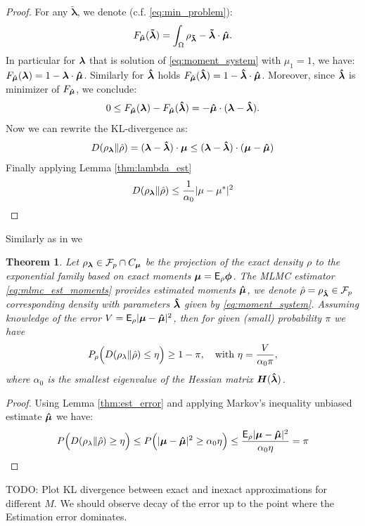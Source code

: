 \documentclass{article}
\newtheorem{theorem}{Theorem}[section]
\def\vc#1{\mathbf{\boldsymbol{#1}}}     %
\def\tn#1{\boldsymbol{#1}}
\def \E{{\mathsf E}}
\def\todo#1{{\color{red}TODO: #1}}
\def\abs#1{|#1|}
\begin{document}
\begin{proof}
\def\tvl{\vc{\tilde\lambda}}
For any $\tvl$, we denote (c.f. \eqref{eq:min_problem}):
\[
F_{\estvmu}(\tvl) = \int_{\Omega} \rho_{\tvl} - \tvl\cdot\estvmu.
\]
In particular for $\vl$ that is solution of \eqref{eq:moment_system} with $\mu_1 = 1$, we have:
$F_{\estvmu}(\vl) = 1 - \vl\cdot\estvmu$. Similarly for $\estvl$ holds
$F_{\estvmu}(\estvl) = 1 - \estvl\cdot\estvmu$. Moreover, since $\estvl$ is minimizer 
of $F_{\estvmu}$, we conclude:
\[
 0\le F_{\estvmu}(\vl) - F_{\estvmu}(\estvl) = - \estvmu\cdot(\vl - \estvl).
\]
Now we can rewrite the KL-divergence as:
\[
  D(\rho_{\vl}\Vert \estrho) = (\vl - \estvl)\cdot \vmu \le
  (\vl - \estvl)\cdot (\vmu - \estvmu)
\]
Finally applying Lemma \ref{thm:lambda_est}
\[
D(\rho_{\vl}\Vert \estrho) \le \frac{1}{\alpha_0} \abs{\mu - \mu^*}^2
\]
 
\end{proof}
Similarly as in \cite[Theorem 3]{Barron1991} we  
\begin{theorem}
  \label{eq:estimate_err_var}
  Let $\rho_{\vl} \in \mathcal F_p \cap C_{\vmu}$ be the projection of the exact density $\rho$ to the exponential family based on exact moments  $\vmu = \E_\rho \vphi$. The MLMC estimator \eqref{eq:mlmc_est_moments} provides estimated moments $\estvmu$, we denote $\estrho = \rho_{\estvl}\in \mathcal F_p$ corresponding density with parameters $\estvl$ given by \eqref{eq:moment_system}.
  Assuming knowledge of the error $V = \E_{\rho} |\vmu - \estvmu|^2$, then for given (small) probability $\pi$
  we have
  \[
      P_{\rho}\Big( D(\rho_{\lambda}\Vert \hat\rho) \le \eta\Big) \ge 1 - \pi,\quad 
      \text{with } \eta = \frac{V}{\alpha_0 \pi},
  \]
  where $\alpha_0$ is the smallest eigenvalue of the Hessian matrix $\tn H(\estvl)$.
  
\end{theorem}
\begin{proof}
  Using Lemma \ref{thm:est_error} and applying Markov's inequality unbiased estimate $\estvmu$ we have:
  \[
   P\Big( D(\rho_{\lambda}\Vert \estrho) \ge \eta\Big) 
   \le P\Big( \abs{\vmu - \estvmu}^2 \ge \alpha_0  \eta\Big)
   \le \frac{\E_{\rho} |\vmu - \estvmu|^2}{\alpha_0 \eta} = \pi
  \]
\end{proof}





\todo{Plot KL divergence between exact and inexact approximations for different $M$. 
We should observe decay of the error up to the point where the Estimation error dominates.}
\end{document}
